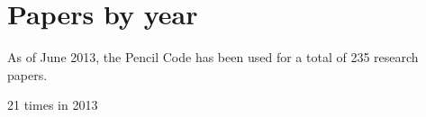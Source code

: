 \documentclass[12pt]{article}
\begin{document}
\section{Papers by year}

As of June 2013, the {\sc Pencil Code} has been used for a total of 235 research papers.
\begin{description}
\item
21 times in 2013 \citep{
2013MNRAS.432.1396G,%
2013arXiv1306.3672M,%
2013A&A...554A..39V,%
2013arXiv1305.5693B,%
2013arXiv1305.0307P,%
2013PhRvE..87d3104C,%
2013PhRvD..87h3007K,%
2013EPJWC..4604003L,%
2013arXiv1304.3870P,%
2013MNRAS.430L..40G,%
2013MNRAS.429.2469B,%
2013ApJ...765..115R,%
2013MNRAS.429.1686D,%
2013MNRAS.428.3569C,%
2013IAUS..290..201D,%
2013arXiv1302.5841J,%
2013ApJ...763..117D,%
2013A&A...550A..30B,%
2013arXiv1301.2595K,%
2013arXiv1301.2248W,%
}
\end{description}
\end{document}
